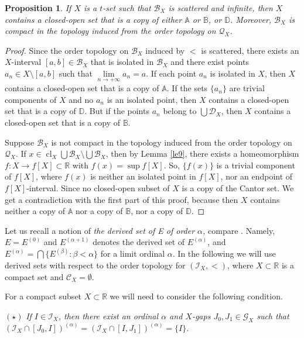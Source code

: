 \documentclass[12pt,a4paper,leqno]{amsart}
\newcommand{\cl}{\operatorname{cl}}
\newtheorem{pro}[thm]{Proposition}
\theoremstyle{definition}
\begin{document}
\begin{pro}\label{p22} 
If  $X$ is a $ t $-set such that $\mathcal B_X$ is scattered and infinite, then  $X$ contains a closed-open set that is a copy of either $\mathbb A$ 
or $\mathbb B$, or $\mathbb D$. Moreover, $\mathcal B_X$
is compact in the topology induced from the order topology on $\mathcal Q_X$.
 \end{pro}
\begin{proof} 
Since  the order topology on $\mathcal B_X$ induced by $<$ is  scattered, there exists an $X$-interval $[a,b]\in \mathcal B_X$ that is isolated in $\mathcal B_X$ and there exist points $a_n \in X \setminus [a,b]$ such that $\lim\limits_{n\to +\infty} a_n =a$. If each point $a_n$ is isolated  in $X$, then   $X$ contains a closed-open set that is a copy of $\mathbb A$.
If the sets $\{a_n\}$ are trivial components of $X$ and no $a_n$ is an isolated point, then   $X$ contains a closed-open set that is a copy of $\mathbb D$. But if the points $a_n$ belong to $\bigcup \mathcal D_X$, then   $X$ contains a closed-open set that is a copy of $\mathbb B$.

Suppose  $\mathcal B_X$
is not compact in the topology induced from the order topology on $\mathcal Q_X$. If $x\in \cl_X \bigcup \mathcal B_X \setminus \bigcup \mathcal B_X$, then by Lemma \ref{le9}, there exists a homeomorphism   $f\colon X \to f[X] \subset  \mathbb R$   with $f(x) = \sup f[X]$. So, $\{ f(x)\}$ is a trivial component of 
$f[X]$, where $f(x)$  is neither an isolated point in $f[X]$, nor an endpoint of $f[X]$-interval.  Since  no closed-open subset of $X$ is a copy of the Cantor set. We get a contradiction with the first part of this proof, because then $X$ contains neither a copy of $\mathbb A$ nor a copy of $\mathbb B$, nor a copy of $\mathbb D$.  
   \end{proof}

Let us recall a notion of  \textit{the derived set of E of order $\alpha$, } compare \cite[p. 64]{si}. Namely, $E= E^{(0)}$ and $E^{(\alpha +1)}$ denotes the derived set of $E^{(\alpha)}$, and $E^{(\alpha )}= \bigcap\{E^{(\beta)}\colon \beta < \alpha\}$ for a limit ordinal $\alpha$. In the following we will use derived sets with respect to the order topology for $(\mathcal I_X, <)$, where $X\subset \mathbb R$ is a compact set and $\mathcal C_X=\emptyset$. 

For a compact subset $X\subset \mathbb R$ we will need to consider the following condition.

 $(\star)$ \hspace{0.1cm} \textit{If $I\in \mathcal I_X$, then there exist an ordinal  $\alpha$ and $X$-gaps $J_0, J_1 \in \mathcal G_X$ such that 
 $(\mathcal I_X \cap [J_0, I])^{(\alpha)} = (\mathcal I_X \cap [I, J_1])^{(\alpha)}=\{ I\}.$} 
\end{document}
